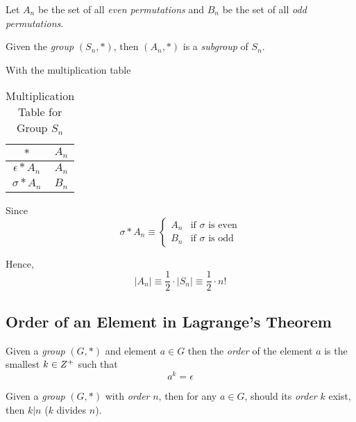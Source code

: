 \begin{remark}
    Let $A_n$ be the set of all \textit{even permutations} and $B_n$ be the set of all \textit{odd permutations}.
    
    Given the \textit{group} $(S_n, \ast)$, then $(A_n, \ast)$ is a \textit{subgroup} of $S_n$.
    
    With the multiplication table
    \begin{table}[H]
    \centering
    \begin{tabular}{c | c}
    \toprule
    $\ast$              & $A_n$ \\ 
    \midrule
    $\epsilon \ast A_n$ & $A_n$ \\
    $\sigma   \ast A_n$ & $B_n$ \\ 
    \bottomrule
    \end{tabular}
    \caption{Multiplication Table for Group $S_n$}
    \end{table}
    
    Since
    \begin{equation}
        \sigma \ast A_n \equiv \begin{cases}
            A_n &\text{if } \sigma \text{ is even} \\
            B_n &\text{if } \sigma \text{ is odd}
        \end{cases}
    \end{equation}
    
    Hence,
    \begin{equation}
        \lvert A_n \rvert \equiv \frac{1}{2} \cdot \lvert S_n \rvert \equiv \frac{1}{2} \cdot n!
    \end{equation}
\end{remark}

\subsection{Order of an Element in Lagrange's Theorem}

\begin{definition}
    Given a \textit{group} $(G, \ast)$ and element $a \in G$ then the \textit{order} of the element $a$ is the smallest $k \in \relax{Z}^{+}$ such that
    \begin{equation}
        a^{k} = \epsilon
    \end{equation}
\end{definition}

\begin{proposition}
    Given a \textit{group} $(G, \ast)$ with \textit{order} $n$, then for any $a \in G$, should its \textit{order} $k$ exist, then $k \vert n$ ($k$ divides $n$).
\end{proposition}

